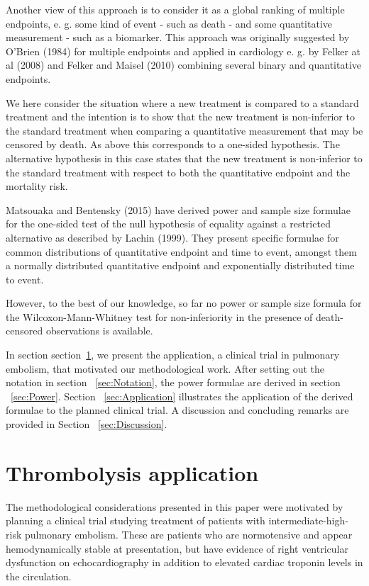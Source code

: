 \documentclass[bimj,fleqn]{w-art}\usepackage[]{graphicx}\usepackage[]{color}
\theoremstyle{plain}
\theoremstyle{definition}
\begin{document}
Another view of this approach is to consider it as a global ranking of
multiple endpoints, e. g. some kind of event - such as death - and some
quantitative measurement - such as a biomarker. This approach was originally
suggested by O'Brien (1984) for multiple endpoints and applied in cardiology
e. g. by Felker at al (2008) and Felker and Maisel (2010) combining several
binary and quantitative endpoints.

We here consider the situation where a new treatment is compared to a standard
treatment and the intention is to show that the new treatment is non-inferior
to the standard treatment when comparing a quantitative measurement that may
be censored by death. As above this corresponds to a one-sided hypothesis.
The alternative hypothesis in this case states that the new treatment is
non-inferior to the standard treatment with respect to both the quantitative
endpoint and the mortality risk.

Matsouaka and Bentensky (2015) have derived power and sample size formulae for
the one-sided test of the null hypothesis of equality against a restricted
alternative as described by Lachin (1999). They present specific formulae for
common distributions of quantitative endpoint and time to event, amongst them
a normally distributed quantitative endpoint and exponentially distributed
time to event.

However, to the best of our knowledge, so far no power or sample size formula
for the Wilcoxon-Mann-Whitney test for non-inferiority in the presence of
death-censored observations is available.

In section section~\ref{sec:ThrombolysisApplication}, we present the
application, a clinical trial in pulmonary embolism, that motivated our
methodological work. After setting out the notation in section
~\ref{sec:Notation}, the power formulae are derived in section ~\ref{sec:Power}.
Section ~\ref{sec:Application} illustrates the application of the derived
formulae to the planned clinical trial. A discussion and concluding remarks
are provided in Section ~\ref{sec:Discussion}.


\section{Thrombolysis application}
\label{sec:ThrombolysisApplication}
The methodological considerations presented in this paper were motivated by
planning a clinical trial studying treatment of patients with
intermediate-high-risk pulmonary embolism. These are patients who are
normotensive and appear hemodynamically stable at presentation, but have
evidence of right ventricular dysfunction on echocardiography in addition to
elevated cardiac troponin levels in the circulation.
\end{document}
